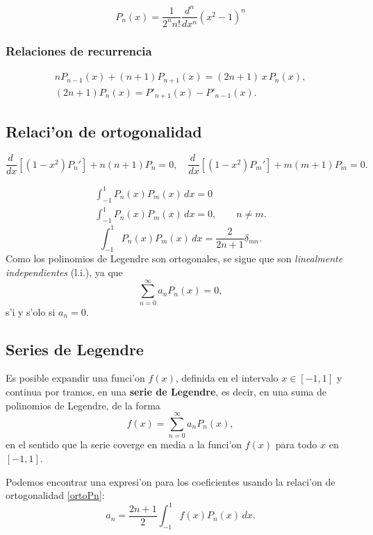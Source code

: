 \begin{equation}
P_{n}(x)=\frac{1}{2^{n}n!}\frac{d^{n}}{dx^{n}}(x^2-1)^{n}
\end{equation}


\subsubsection{Relaciones de recurrencia}
\begin{gather}
nP_{n-1}(x)+(n+1)P_{n+1}(x)=(2n+1)\,x\,P_n(x), \\
(2n+1)P_n(x)=P'_{n+1}(x)-P'_{n-1}(x).
\end{gather}

\subsection{Relaci'on de ortogonalidad}
\begin{equation}
\frac{d\ }{dx}\left[(1 - x^2) P_n' \right]+ n (n + 1) P_n=0, \quad
\frac{d\ }{dx}\left[(1 - x^2) P_m' \right]+ m (m + 1) P_m=0 .
\end{equation}

\begin{gather}
[n (n + 1) - m (m + 1)]\int_{-1}^1 P_n(x) P_m(x)\,d x = 0 
\\
\int_{-1}^1 P_n(x) P_m(x)\,d x = 0, \qquad n\neq m.
\end{gather}
\begin{equation}\label{ortoPn}
\boxed{\int_{-1}^{1}P_n(x)P_m(x)\,dx=\frac{2}{2n+1}\delta_{mn}.}
\end{equation}
Como los polinomios de Legendre son ortogonales, se sigue que son \textit{linealmente independientes} (l.i.), ya que
\begin{equation}
\sum_{n=0}^\infty a_nP_n(x)=0,
\end{equation}
s'i y s'olo si $a_n=0$.
\subsection{Series de Legendre}
Es posible expandir una funci'on $f(x)$, definida en el intervalo $x\in[-1,1]$ y continua por tramos, en una \textbf{serie de Legendre}, es decir, en una suma de polinomios de Legendre, de la forma
\begin{equation}
f(x)=\sum_{n=0}^\infty a_nP_n(x),
\end{equation}
en el sentido que la serie coverge en media a la funci'on $f(x)$ para todo $x$ en $[-1,1]$.

Podemos encontrar una expresi'on para los coeficientes usando la relaci'on de ortogonalidad \eqref{ortoPn}:
\begin{equation}
a_n=\frac{2n+1}{2}\int_{-1}^1 f(x)P_n(x)\,dx.
\end{equation}
